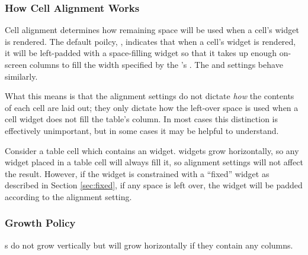 \subsubsection{How Cell Alignment Works}

Cell alignment determines how remaining space will be used when a
cell's widget is rendered.  The default poilcy, ,
indicates that when a cell's widget is rendered, it will be
left-padded with a space-filling widget so that it takes up enough
on-screen columns to fill the width specified by the 's
.  The  and  settings
behave similarly.

What this means is that the alignment settings do not dictate
\textit{how} the contents of each cell are laid out; they only dictate
how the left-over space is used when a cell widget does not fill the
table's column.  In most cases this distinction is effectively
unimportant, but in some cases it may be helpful to understand.

Consider a table cell which contains an  widget.  
widgets grow horizontally, so any  widget placed in a table
cell will always fill it, so alignment settings will not affect the
result.  However, if the  widget is constrained with a
``fixed'' widget as described in Section \ref{sec:fixed}, if any space
is left over, the widget will be padded according to the alignment
setting.

\subsubsection{Growth Policy}

s do not grow vertically but will grow horizontally if they
contain any  columns.
